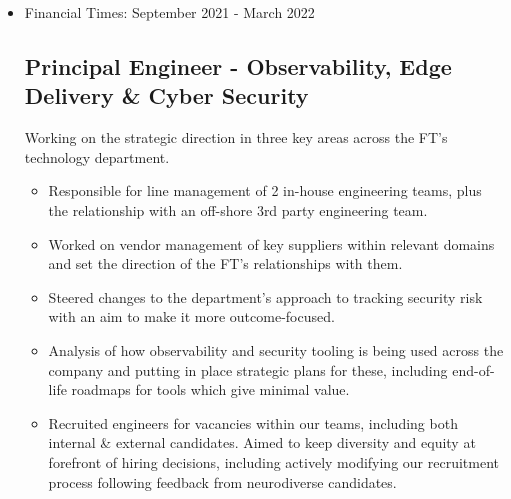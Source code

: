 \documentclass[a4paper]{article}
\newenvironment{detail}{\begin{adjustwidth}{10pt}{}}{\end{adjustwidth}}
\begin{document}
\begin{itemize}
\begin{detail}
\begin{itemize}
	\item Built a new centralised cyber security function, bringing together people, process and budgets from across the organisation.  This reduced barriers in communication and led to better-aligned security outcomes.
	\item Line managed a mixed-discipline team of a dozen people, including Engineers, Risk Analysts and IT governance roles.
	\item Steered the direction of Security work across the technology department, and the organisation as a whole.
	\item Worked with a third party consultancy to build a strategic roadmap and help prioritise security initiatives.
	\item Involved in recruitment of a permanent VP of Cyber Security.
\end{itemize}
\end{detail}

\item Financial Times: September 2021 - March 2022
\subsection*{Principal Engineer - Observability, Edge Delivery \& Cyber Security}
\begin{detail}
Working on the strategic direction in three key areas across the FT's technology department.

\begin{itemize}
	\item Responsible for line management of 2 in-house engineering teams, plus the relationship with an off-shore 3rd party engineering team.
	\item Worked on vendor management of key suppliers within relevant domains and set the direction of the FT's relationships with them.
	\item Steered changes to the department's approach to tracking security risk with an aim to make it more outcome-focused.
	\item Analysis of how observability and security tooling is being used across the company and putting in place strategic plans for these, including end-of-life roadmaps for tools which give minimal value.
	\item Recruited engineers for vacancies within our teams, including both internal \& external candidates.  Aimed to keep diversity and equity at forefront of hiring decisions, including actively modifying our recruitment process following feedback from neurodiverse candidates.
\end{itemize}
\end{detail}


\end{itemize}
\end{document}
